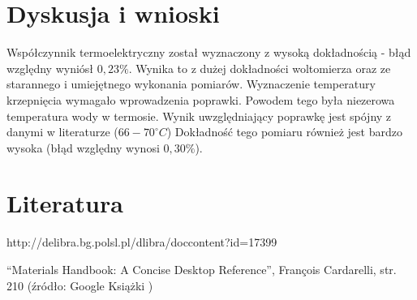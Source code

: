 \documentclass[polish, 11pt, a4paper]{article}
\begin{document}
	\section{Dyskusja i wnioski}
		Współczynnik termoelektryczny został wyznaczony z wysoką dokładnością - błąd względny wyniósł \(0,23\%\). Wynika to z dużej dokładności woltomierza oraz ze starannego i umiejętnego wykonania pomiarów.
		Wyznaczenie temperatury krzepnięcia wymagało wprowadzenia poprawki. Powodem tego była niezerowa temperatura wody w termosie. Wynik uwzględniający poprawkę jest spójny z danymi w literaturze (\(66-70^\circ C\)) Dokładność tego pomiaru również jest bardzo wysoka (błąd względny wynosi \(0,30\%\)).
		
	\section{Literatura}
	\begin{enumerate}[label={[\arabic*]}]
		\item http://delibra.bg.polsl.pl/dlibra/doccontent?id=17399
		\item \enquote{Materials Handbook: A Concise Desktop Reference}, François Cardarelli, str. 210 (źródło: Google Książki )
	\end{enumerate}
\end{document}
